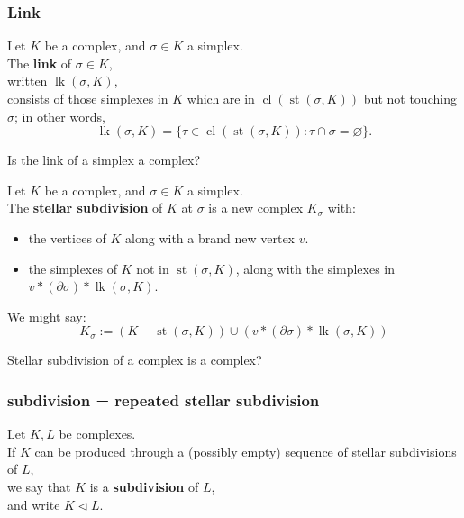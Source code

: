 \documentclass[14pt]{beamer}
\newcommand{\boundary}{\partial}
\newcommand{\join}{\ast}
\newcommand{\subdivided}{\triangleleft}
\DeclareMathOperator{\st}{st}
\DeclareMathOperator{\lk}{lk}
\DeclareMathOperator{\cl}{cl}
\begin{document}
\begin{frame}
\frametitle{Link}

\begin{definition}
Let $K$ be a complex, and $\sigma \in K$ a simplex.  \\
The \textbf{link} of $\sigma \in K$, \\
\quad written $\lk(\sigma,K)$, \\
consists of those simplexes in $K$ which are in $\cl(\st(\sigma,K))$
but not touching $\sigma$; in other words,
$$
\lk(\sigma,K) = \{ \tau \in \cl(\st(\sigma,K)) : \tau \cap \sigma =
\varnothing \}.
$$
\end{definition}
\pause
\begin{problem}
Is the link of a simplex a complex?
\end{problem}
\end{frame}

\begin{frame}
\begin{definition}
  Let $K$ be a complex, and $\sigma \in K$ a simplex.  \\
  The \textbf{stellar subdivision} of $K$ at $\sigma$ is a new complex
  $K_\sigma$ with:
\begin{itemize}
\item the vertices of $K$ along with a brand new vertex $v$.
\item the simplexes of $K$ not in $\st(\sigma,K)$, along with the
  simplexes in $v \join (\boundary \sigma) \join \lk(\sigma,K)$.
\end{itemize}
We might say:
$$
K_\sigma := (K - \st(\sigma,K)) \cup (v \join (\boundary \sigma) \join
\lk(\sigma,K))
$$
\end{definition}
\pause
\begin{problem}
  Stellar subdivision of a complex is a complex?
\end{problem}
\end{frame}

\begin{frame}
\frametitle{subdivision = repeated stellar subdivision}

\begin{definition}
  Let $K, L$ be complexes.  \\
  If $K$ can be produced through a (possibly
  empty) sequence of stellar subdivisions of $L$, \\
  we say that $K$ is a   \textbf{subdivision} of $L$, \\
  and write $K \subdivided L$.
\end{definition}

\end{frame}
\end{document}

